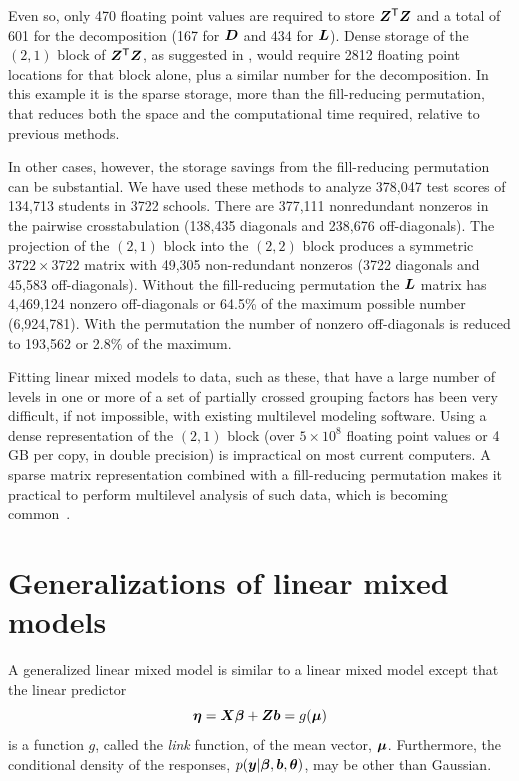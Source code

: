 \documentclass[12pt]{article}
\begin{document}
Even so, only 470 floating point values are required to store
$\bm{Z}^\mathsf{T}\bm{Z}$ and a total of 601 for the decomposition (167 for $\bm{D}$
and 434 for $\bm{L}$).  Dense storage of the $(2,1)$ block of
$\bm{Z}^\mathsf{T}\bm{Z}$, as suggested in \citet{MLwiN:2002}, would require 2812
floating point locations for that block alone, plus a similar number
for the decomposition.  In this example it is the sparse storage, more
than the fill-reducing permutation, that reduces both the space and the
computational time required, relative to previous methods.

In other cases, however, the storage savings from the fill-reducing
permutation can be substantial.  We have used these methods to analyze
378,047 test scores of 134,713 students in 3722 schools.  There are
377,111 nonredundant nonzeros in the pairwise crosstabulation (138,435
diagonals and 238,676 off-diagonals).  The projection of the $(2,1)$
block into the $(2,2)$ block produces a symmetric $3722\times 3722$
matrix with 49,305 non-redundant nonzeros (3722 diagonals and 45,583
off-diagonals).  Without the fill-reducing permutation the $\bm{L}$
matrix has 4,469,124 nonzero off-diagonals or 64.5\% of the maximum
possible number (6,924,781). With the permutation the number of
nonzero off-diagonals is reduced to 193,562 or 2.8\% of the maximum.

Fitting linear mixed models to data, such as these, that have a large
number of levels in one or more of a set of partially crossed grouping
factors has been very difficult, if not impossible, with existing
multilevel modeling software.  Using a dense representation of the
$(2,1)$ block (over $5\times 10^8$ floating point values or 4 GB per
copy, in double precision) is impractical on most current computers.  A
sparse matrix representation combined with a fill-reducing permutation
makes it practical to perform multilevel analysis of such data, which is
becoming common~\citep{Rnews:Lockwood+Doran+Mccaffrey:2003}.

\section{Generalizations of linear mixed models}
\label{sec:Generalizations}

A generalized linear mixed model is similar to a linear mixed model
except that the linear predictor
\begin{equation}
  \label{eq:GLMMlinpred}
  \bm{\eta} = \bm{X}\bm{\beta}+\bm{Z}\bm{b} = g(\bm{\mu})
\end{equation}
is a function $g$, called the \emph{link} function, of the mean
vector, $\bm{\mu}$.  Furthermore, the conditional density of the
responses, $p(\bm{y}|\bm{\beta},\bm{b},\bm{\theta})$, may be other than Gaussian.
\end{document}
